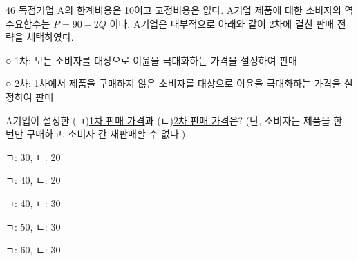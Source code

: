 \begin{question}{46}
독점기업 A의 한계비용은 10이고 고정비용은 없다. A기업 제품에 대한 소비자의 역수요함수는 $P=90-2Q$ 이다. A기업은 내부적으로 아래와 같이 2차에 걸친 판매 전략을 채택하였다.
\begin{framedtext}
○ 1차: 모든 소비자를 대상으로 이윤을 극대화하는 가격을 설정하여 판매 \par
○ 2차: 1차에서 제품을 구매하지 않은 소비자를 대상으로 이윤을 극대화하는 가격을 설정하여 판매
\end{framedtext}
A기업이 설정한 (ㄱ)\uline{1차 판매 가격}과 (ㄴ)\uline{2차 판매 가격}은? (단, 소비자는 제품을 한 번만 구매하고, 소비자 간 재판매할 수 없다.) \par
\begin{choices}
  \item ㄱ: 30, ㄴ: 20
  \item ㄱ: 40, ㄴ: 20
  \item ㄱ: 40, ㄴ: 30
  \item ㄱ: 50, ㄴ: 30
  \item ㄱ: 60, ㄴ: 30
\end{choices}
\end{question}
